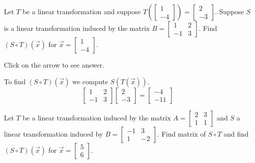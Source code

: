 \documentclass{ximera}
\begin{document}
\begin{problem}\label{prb:6.6} Let $T$ be a linear transformation and suppose $T \left( \left[ \begin{array}{r}
1 \\
-4
\end{array} \right] \right) = \left[ \begin{array}{r}
2 \\
-3
\end{array} \right]$. Suppose $S$ is a linear transformation induced by the matrix $B = \left[ \begin{array}{rr}
1 & 2 \\
-1 & 3
\end{array} \right]$. Find $\left( S \circ T \right) \left( \vec{x} \right)$ for $\vec{x} = \left[ \begin{array}{r}
1 \\
-4
\end{array} \right]$.

Click on the arrow to see answer.
\begin{expandable}
To find $\left( S \circ T \right) \left( \vec{x} \right)$ we compute $S(T(\vec{x}))$.
\[
\left[ \begin{array}{rr}
1 & 2 \\
-1 & 3
\end{array} \right]
\left[ \begin{array}{r}
2 \\
-3
\end{array} \right]
 = \left[
\begin{array}{r}
-4 \\
-11
\end{array}
\right]
\]
\end{expandable}
\end{problem}


\begin{problem}\label{prb:6.7}  Let $T$ be a linear transformation induced by the matrix $A = \left[ \begin{array}{rr}
2 & 3 \\
1 & 1
\end{array}\right]$ and $S$ a linear transformation induced by $B = \left[ \begin{array}{rr}
-1 & 3 \\
1 & -2
\end{array}\right]$. Find matrix of $S \circ T$ and find $\left( S \circ T \right) \left( \vec{x} \right)$ for $\vec{x} = \left[ \begin{array}{r}
5 \\
6
\end{array} \right]$.
\end{problem}
\end{document}
